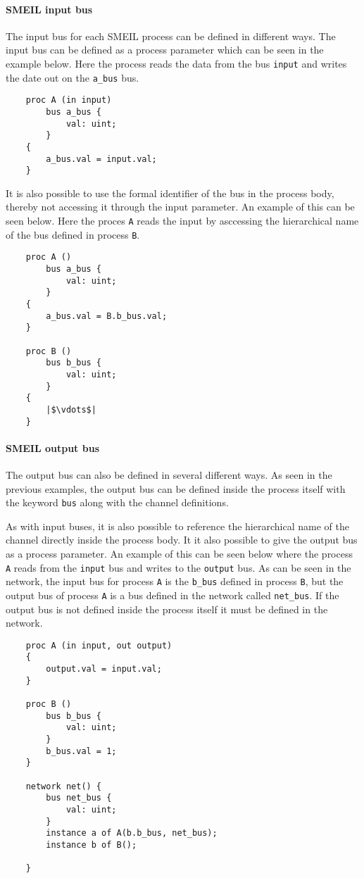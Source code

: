 \paragraph{SMEIL input bus}
The input bus for each SMEIL process can be defined in different ways. The input bus can be defined as a process parameter which can be seen in the example below. Here the process reads the data from the bus \texttt{input} and writes the date out on the \texttt{a\_bus} bus.
\begin{verbatim}
    proc A (in input)
        bus a_bus {
            val: uint;
        }
    {
        a_bus.val = input.val;
    }
\end{verbatim}
It is also possible to use the formal identifier of the bus in the process body, thereby not accessing it through the input parameter. An example of this can be seen below. Here the proces \texttt{A} reads the input by asccessing the hierarchical name of the bus defined in process \texttt{B}.
\begin{verbatim}
    proc A ()
        bus a_bus {
            val: uint;
        }
    {
        a_bus.val = B.b_bus.val;
    }

    proc B ()
        bus b_bus {
            val: uint;
        }
    {
        |$\vdots$|
    }
\end{verbatim}

\paragraph{SMEIL output bus}
The output bus can also be defined in several different ways.
As seen in the previous examples, the output bus can be defined inside the process itself with the keyword \texttt{bus} along with the channel definitions.

As with input buses, it is also possible to reference the hierarchical name of the channel directly inside the process body.
It it also possible to give the output bus as a process parameter. An example of this can be seen below where the process \texttt{A} reads from the \texttt{input} bus and writes to the \texttt{output} bus. As can be seen in the network, the input bus for process \texttt{A} is the \texttt{b\_bus} defined in process \texttt{B}, but the output bus of process \texttt{A} is a bus defined in the network called \texttt{net\_bus}. If the output bus is not defined inside the process itself it must be defined in the network.
\begin{verbatim}
    proc A (in input, out output)
    {
        output.val = input.val;
    }

    proc B ()
        bus b_bus {
            val: uint;
        }
        b_bus.val = 1;
    }

    network net() {
        bus net_bus {
            val: uint;
        }
        instance a of A(b.b_bus, net_bus);
        instance b of B();

    }
\end{verbatim}

